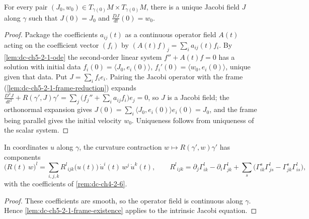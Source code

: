\begin{lemma}
  \label{lem:dc-ch5-2-1-frame-existence}


  For every pair $(J_0,w_0)\in T_{\gamma(0)}M\times T_{\gamma(0)}M$, there is a
  unique Jacobi field $J$ along $\gamma$ such that
  $J(0)=J_0$ and $\frac{DJ}{dt}(0)=w_0$.
\end{lemma}
\begin{proof}

  \sketch
  Package the coefficients $a_{ij}(t)$ as a continuous operator field $A(t)$ acting on the
  coefficient vector $(f_i)$ by $(A(t)f)_j=\sum_i a_{ij}(t)f_i$. By \cref{lem:dc-ch5-2-1-ode}
  the second-order linear system $f''+A(t)f=0$ has a solution with initial data
  $f_i(0)=\langle J_0,e_i(0)\rangle$, $f_i'(0)=\langle w_0,e_i(0)\rangle$, unique given that
  data. Put $J=\sum_i f_i e_i$. Pairing the Jacobi operator with the frame
  (\cref{lem:dc-ch5-2-1-frame-reduction}) expands
  $\frac{D^2J}{dt^2}+R(\gamma',J)\gamma'=\sum_j\big(f_j''+\sum_i a_{ij}f_i\big)e_j=0$, so $J$
  is a Jacobi field; the orthonormal expansion gives
  $J(0)=\sum_i\langle J_0,e_i(0)\rangle e_i(0)=J_0$, and the frame being parallel gives the
  initial velocity $w_0$. Uniqueness follows from uniqueness of the scalar system.
\end{proof}

\begin{lemma}
  \label{lem:dc-ch5-2-1-real-curvature}

  In coordinates $u$ along $\gamma$, the curvature contraction
  $w\mapsto R(\gamma',w)\gamma'$ has components
  $$
  \big(R(t)\,w\big)^l=\sum_{i,j,k}R^l{}_{ijk}\big(u(t)\big)\,\dot u^i(t)\,w^j\,\dot u^k(t),
  \qquad
  R^l{}_{ijk}=\partial_j\Gamma^l_{ik}-\partial_i\Gamma^l_{jk}
    +\sum_s\big(\Gamma^s_{ik}\Gamma^l_{js}-\Gamma^s_{jk}\Gamma^l_{is}\big),
  $$
  with the coefficients of \cref{rem:dc-ch4-2-6}.
\end{lemma}
\begin{proof}

  \sketch
  These coefficients are smooth, so the operator field is continuous along $\gamma$. Hence
  \cref{lem:dc-ch5-2-1-frame-existence} applies to the intrinsic Jacobi equation.
\end{proof}

